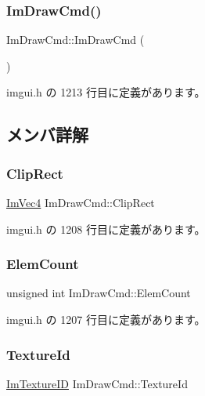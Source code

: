 \subsubsection{\texorpdfstring{Im\+Draw\+Cmd()}{ImDrawCmd()}}
{\footnotesize\ttfamily Im\+Draw\+Cmd\+::\+Im\+Draw\+Cmd (\begin{DoxyParamCaption}{ }\end{DoxyParamCaption})\hspace{0.3cm}{\ttfamily [inline]}}



 imgui.\+h の 1213 行目に定義があります。



\subsection{メンバ詳解}
\mbox{\label{struct_im_draw_cmd_a838918f420ff81cb8dc7265077592daa}} 
\subsubsection{\texorpdfstring{Clip\+Rect}{ClipRect}}
{\footnotesize\ttfamily \mbox{\hyperlink{struct_im_vec4}{Im\+Vec4}} Im\+Draw\+Cmd\+::\+Clip\+Rect}



 imgui.\+h の 1208 行目に定義があります。

\mbox{\label{struct_im_draw_cmd_aafe2532964fb1f6905d67d84dd3e8730}} 
\subsubsection{\texorpdfstring{Elem\+Count}{ElemCount}}
{\footnotesize\ttfamily unsigned int Im\+Draw\+Cmd\+::\+Elem\+Count}



 imgui.\+h の 1207 行目に定義があります。

\mbox{\label{struct_im_draw_cmd_a4f3b5985ece9ca6b71e7a8e7d85a82e5}} 
\subsubsection{\texorpdfstring{Texture\+Id}{TextureId}}
{\footnotesize\ttfamily \mbox{\hyperlink{imgui_8h_a364f4447ecbc4ca176145ccff9db6286}{Im\+Texture\+ID}} Im\+Draw\+Cmd\+::\+Texture\+Id}



